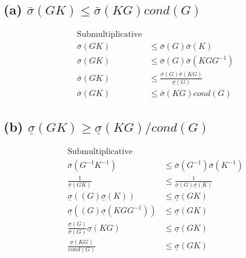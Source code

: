 \documentclass[12pt, letterpaper]{article}
\begin{document}
\subsection*{(a) $\bar{\sigma}(GK) \leq \bar{\sigma}(KG) cond(G)$}
\begin{align*}
    \text{Submultiplicative} \\
    \bar{\sigma}(GK) &\leq \bar{\sigma}(G) \bar{\sigma}(K) \\
    \bar{\sigma}(GK) &\leq \bar{\sigma}(G) \bar{\sigma}(KGG^{-1}) \\
    \bar{\sigma}(GK) &\leq \frac{\bar{\sigma}(G) \bar{\sigma}(KG)}{\underline{\sigma}(G)} \\
    \bar{\sigma}(GK) &\leq \bar{\sigma}(KG) cond(G)
\end{align*}
\subsection*{(b) $\underline{\sigma}(GK) \geq \underline{\sigma}(KG)/cond(G)$}
\begin{align*}
    \text{Submultiplicative} \\
    \bar{\sigma}(G^{-1}K^{-1}) &\leq \bar{\sigma}(G^{-1}) \bar{\sigma}(K^{-1}) \\
    \frac{1}{\underline{\sigma}(GK)} &\leq \frac{1}{\underline{\sigma}(G) \underline{\sigma}(K)} \\
    \underline{\sigma}((G) \underline{\sigma}(K)) &\leq \underline{\sigma}(GK) \\
    \underline{\sigma}((G) \underline{\sigma}(KGG^{-1})) &\leq \underline{\sigma}(GK) \\
    \frac{\underline{\sigma}(G)}{\bar{\sigma}(G)} \underline{\sigma}(KG) &\leq \underline{\sigma}(GK) \\
    \frac{\underline{\sigma}(KG)}{cond(G)} &\leq \underline{\sigma}(GK)
\end{align*}
\end{document}
